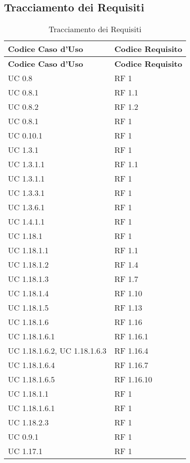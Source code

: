 \subsection{Tracciamento dei Requisiti}{ 
\renewcommand*{\arraystretch}{1.4} 
\begin{longtable} [c]{| p{4cm} | p{4cm} |} 
\caption{Tracciamento dei Requisiti \label{tab:traccReq}}\\ \hline\textbf{Codice Caso d'Uso} & \textbf{Codice Requisito} \\ 
\hline \endfirsthead \hline 
\textbf{Codice Caso d'Uso} & \textbf{Codice Requisito} \\ 
\hline \endhead \hline \endfoot \hline \endlastfoot 
UC 0.8 & RF 1\\ 
 \hline 
UC 0.8.1 & RF 1.1\\ 
 \hline 
UC 0.8.2 & RF 1.2\\ 
 \hline 
UC 0.8.1 & RF 1\\ 
 \hline 
UC 0.10.1 & RF 1\\ 
 \hline 
UC 1.3.1 & RF 1\\ 
 \hline 
UC 1.3.1.1 & RF 1.1\\ 
 \hline 
UC 1.3.1.1 & RF 1\\ 
 \hline 
UC 1.3.3.1 & RF 1\\ 
 \hline 
UC 1.3.6.1 & RF 1\\ 
 \hline 
UC 1.4.1.1 & RF 1\\ 
 \hline 
UC 1.18.1 & RF 1\\ 
 \hline 
UC 1.18.1.1 & RF 1.1\\ 
 \hline 
UC 1.18.1.2 & RF 1.4\\ 
 \hline 
UC 1.18.1.3 & RF 1.7\\ 
 \hline 
UC 1.18.1.4 & RF 1.10\\ 
 \hline 
UC 1.18.1.5 & RF 1.13\\ 
 \hline 
UC 1.18.1.6 & RF 1.16\\ 
 \hline 
UC 1.18.1.6.1 & RF 1.16.1\\ 
 \hline 
UC 1.18.1.6.2, UC 1.18.1.6.3 & RF 1.16.4\\ 
 \hline 
UC 1.18.1.6.4 & RF 1.16.7\\ 
 \hline 
UC 1.18.1.6.5 & RF 1.16.10\\ 
 \hline 
UC 1.18.1.1 & RF 1\\ 
 \hline 
UC 1.18.1.6.1 & RF 1\\ 
 \hline 
UC 1.18.2.3 & RF 1\\ 
 \hline 
UC 0.9.1 & RF 1\\ 
 \hline 
UC 1.17.1 & RF 1\\ 

\end{longtable}}
